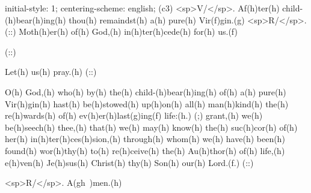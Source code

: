 initial-style: 1;
centering-scheme: english;
(c3) <sp>V/</sp>. Af(h)ter(h) child-(h)bear(h)ing(h) thou(h) remaindst(h) a(h) pure(h) Vir(f)gin.(g) <sp>R/</sp>.(::) Moth(h)er(h) of(h)  God,(h) in(h)ter(h)cede(h) for(h) us.(f)

(::)

Let(h) us(h) pray.(h) (::)

O(h) God,(h) who(h) by(h) the(h) child-(h)bear(h)ing(h) of(h) a(h) pure(h) Vir(h)gin(h) hast(h) be(h)stowed(h) up(h)on(h) all(h) man(h)kind(h) the(h) re(h)wards(h) of(h) ev(h)er(h)last(g)ing(f) life:(h.) (;) grant,(h) we(h) be(h)seech(h) thee,(h) that(h) we(h) may(h) know(h) the(h) suc(h)cor(h) of(h) her(h) in(h)ter(h)ces(h)sion,(h) through(h) whom(h) we(h) have(h) been(h) found(h) wor(h)thy(h) to(h) re(h)ceive(h) the(h) Au(h)thor(h) of(h) life,(h) e(h)ven(h) Je(h)sus(h) Christ(h) thy(h) Son(h) our(h) Lord.(f.) (::)

<sp>R/</sp>. A(gh~)men.(h)